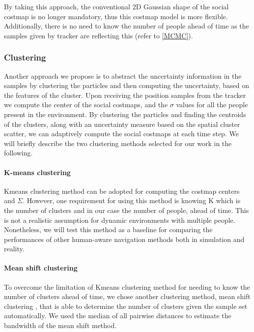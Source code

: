    
By taking this approach, the conventional 2D Gaussian shape of the social costmap is no longer mandatory, thus this costmap model is more flexible. Additionally, there is no need to know the number of people ahead of time as the samples given by tracker are reflecting this (refer to \ref{MCMC}).%



\subsubsection*{Clustering}
Another approach we propose is to abstract the uncertainty information in the samples by clustering the particles and then computing the uncertainty, based on the features of the cluster. Upon receiving the position samples from the tracker we compute the center of the social costmaps, and the ${\sigma}$ values for all the people present in the environment. By clustering the particles and finding the centroids of the clusters, along with an uncertainty measure based on the spatial cluster scatter, we can adaptively compute the social costmaps at each time step. We will briefly describe the two clustering methods selected for our work in the following.
\paragraph{K-means clustering}

Kmeans clustering \cite{hartigan1979algorithm} method can be adopted for computing the costmap centers and $\Sigma$. However, one requirement for using this method is knowing K which is the number of clusters and in our case the number of people, ahead of time. This is not a realistic assumption for dynamic environments with multiple people. Nonetheless, we will test this method as a baseline for comparing the performances of other human-aware navigation methods both in simulation and reality.

\paragraph{Mean shift clustering}
To overcome the limitation of Kmeans clustering method for needing to know the number of clusters ahead of time, we chose another clustering method, mean shift clustering \cite{comaniciu2002mean}, that is able to determine the number of clusters given the sample set automatically. We used the median of all pairwise distances to estimate the bandwidth of the mean shift method.


